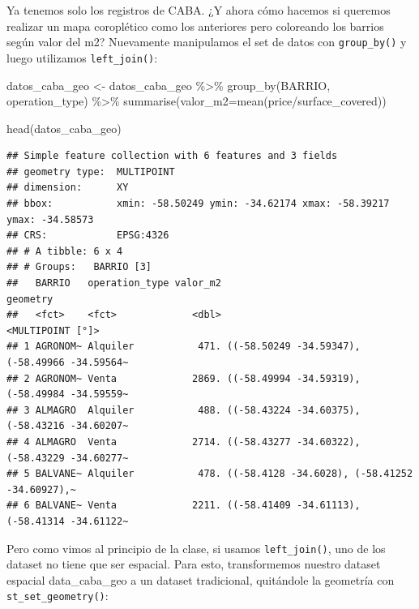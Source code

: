 \documentclass[
  spanish,
]{book}
\newenvironment{Shaded}{\begin{snugshade}}{\end{snugshade}}
\newcommand{\AttributeTok}[1]{\textcolor[rgb]{0.77,0.63,0.00}{#1}}
\newcommand{\FunctionTok}[1]{\textcolor[rgb]{0.00,0.00,0.00}{#1}}
\newcommand{\NormalTok}[1]{#1}
\newcommand{\OtherTok}[1]{\textcolor[rgb]{0.56,0.35,0.01}{#1}}
\newcommand{\SpecialCharTok}[1]{\textcolor[rgb]{0.00,0.00,0.00}{#1}}
\begin{document}
Ya tenemos solo los registros de CABA. ¿Y ahora cómo hacemos si queremos realizar un mapa coroplético como los anteriores pero coloreando los barrios según valor del m2? Nuevamente manipulamos el set de datos con \texttt{group\_by()} y luego utilizamos \texttt{left\_join()}:

\begin{Shaded}
\begin{Highlighting}[]
\NormalTok{datos\_caba\_geo }\OtherTok{\textless{}{-}}\NormalTok{ datos\_caba\_geo }\SpecialCharTok{\%\textgreater{}\%}
  \FunctionTok{group\_by}\NormalTok{(BARRIO, operation\_type) }\SpecialCharTok{\%\textgreater{}\%}
  \FunctionTok{summarise}\NormalTok{(}\AttributeTok{valor\_m2=}\FunctionTok{mean}\NormalTok{(price}\SpecialCharTok{/}\NormalTok{surface\_covered))}
\end{Highlighting}
\end{Shaded}

\begin{Shaded}
\begin{Highlighting}[]
\FunctionTok{head}\NormalTok{(datos\_caba\_geo)}
\end{Highlighting}
\end{Shaded}

\begin{verbatim}
## Simple feature collection with 6 features and 3 fields
## geometry type:  MULTIPOINT
## dimension:      XY
## bbox:           xmin: -58.50249 ymin: -34.62174 xmax: -58.39217 ymax: -34.58573
## CRS:            EPSG:4326
## # A tibble: 6 x 4
## # Groups:   BARRIO [3]
##   BARRIO   operation_type valor_m2                                      geometry
##   <fct>    <fct>             <dbl>                              <MULTIPOINT [°]>
## 1 AGRONOM~ Alquiler           471. ((-58.50249 -34.59347), (-58.49966 -34.59564~
## 2 AGRONOM~ Venta             2869. ((-58.49994 -34.59319), (-58.49984 -34.59559~
## 3 ALMAGRO  Alquiler           488. ((-58.43224 -34.60375), (-58.43216 -34.60207~
## 4 ALMAGRO  Venta             2714. ((-58.43277 -34.60322), (-58.43229 -34.60277~
## 5 BALVANE~ Alquiler           478. ((-58.4128 -34.6028), (-58.41252 -34.60927),~
## 6 BALVANE~ Venta             2211. ((-58.41409 -34.61113), (-58.41314 -34.61122~
\end{verbatim}

Pero como vimos al principio de la clase, si usamos \texttt{left\_join()}, uno de los dataset no tiene que ser espacial. Para esto, transformemos nuestro dataset espacial data\_caba\_geo a un dataset tradicional, quitándole la geometría con \texttt{st\_set\_geometry()}:
\end{document}
